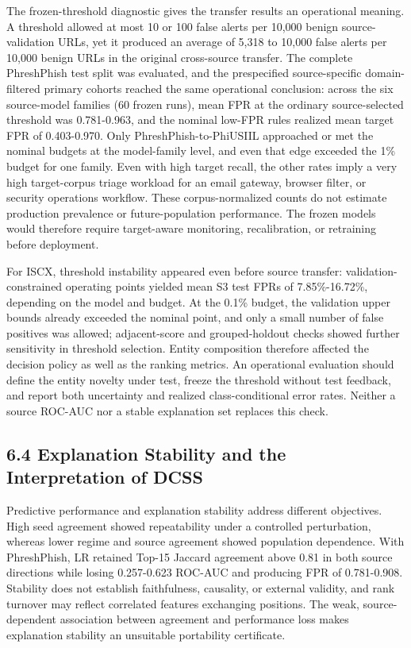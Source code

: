 \documentclass[
  10pt,
]{article}
\begin{document}
The frozen-threshold diagnostic gives the transfer results an
operational meaning. A threshold allowed at most 10 or 100 false alerts
per 10,000 benign source-validation URLs, yet it produced an average of
5,318 to 10,000 false alerts per 10,000 benign URLs in the original
cross-source transfer. The complete PhreshPhish test split was
evaluated, and the prespecified source-specific domain-filtered primary
cohorts reached the same operational conclusion: across the six
source-model families (60 frozen runs), mean FPR at the ordinary
source-selected threshold was 0.781-0.963, and the nominal low-FPR rules
realized mean target FPR of 0.403-0.970. Only PhreshPhish-to-PhiUSIIL
approached or met the nominal budgets at the model-family level, and
even that edge exceeded the 1\% budget for one family. Even with high
target recall, the other rates imply a very high target-corpus triage
workload for an email gateway, browser filter, or security operations
workflow. These corpus-normalized counts do not estimate production
prevalence or future-population performance. The frozen models would
therefore require target-aware monitoring, recalibration, or retraining
before deployment.

For ISCX, threshold instability appeared even before source transfer:
validation-constrained operating points yielded mean S3 test FPRs of
7.85\%-16.72\%, depending on the model and budget. At the 0.1\% budget,
the validation upper bounds already exceeded the nominal point, and only
a small number of false positives was allowed; adjacent-score and
grouped-holdout checks showed further sensitivity in threshold
selection. Entity composition therefore affected the decision policy as
well as the ranking metrics. An operational evaluation should define the
entity novelty under test, freeze the threshold without test feedback,
and report both uncertainty and realized class-conditional error rates.
Neither a source ROC-AUC nor a stable explanation set replaces this
check.

\subsection{6.4 Explanation Stability and the Interpretation of
DCSS}\label{explanation-stability-and-the-interpretation-of-dcss}

Predictive performance and explanation stability address different
objectives. High seed agreement showed repeatability under a controlled
perturbation, whereas lower regime and source agreement showed
population dependence. With PhreshPhish, LR retained Top-15 Jaccard
agreement above 0.81 in both source directions while losing 0.257-0.623
ROC-AUC and producing FPR of 0.781-0.908. Stability does not establish
faithfulness, causality, or external
validity\citep{AlvarezMelis2018, Ghorbani2019, Warnecke2020, Calzarossa2025Robust, Calzarossa2025Framework},
and rank turnover may reflect correlated features exchanging positions.
The weak, source-dependent association between agreement and performance
loss makes explanation stability an unsuitable portability certificate.
\end{document}
